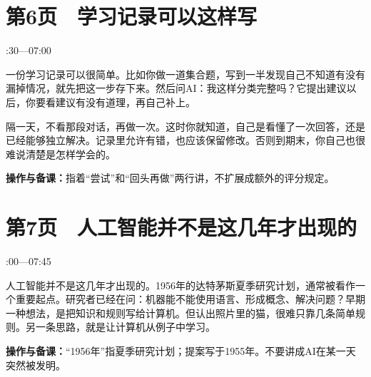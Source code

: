 \documentclass[UTF8,a4paper,11pt,fontset=fandol]{ctexart}
\newcommand{\tip}[1]{\par{\small\color{black!65}\noindent\textbf{操作与备课：}#1\par}}
\begin{document}
\par\noindent\begin{minipage}{\linewidth}

\section*{第6页　学习记录可以这样写}

{\small{}:30—07:00\par}

一份学习记录可以很简单。比如你做一道集合题，写到一半发现自己不知道有没有漏掉情况，就先把这一步存下来。然后问AI：我这样分类完整吗？它提出建议以后，你要看建议有没有道理，再自己补上。

隔一天，不看那段对话，再做一次。这时你就知道，自己是看懂了一次回答，还是已经能够独立解决。记录里允许有错，也应该保留修改。否则到期末，你自己也很难说清楚是怎样学会的。

\tip{指着“尝试”和“回头再做”两行讲，不扩展成额外的评分规定。}

\end{minipage}\par\vspace{2mm}

\par\vspace{4mm}

\par\noindent\begin{minipage}{\linewidth}

\section*{第7页　人工智能并不是这几年才出现的}

{\small{}:00—07:45\par}

人工智能并不是这几年才出现的。1956年的达特茅斯夏季研究计划，通常被看作一个重要起点。研究者已经在问：机器能不能使用语言、形成概念、解决问题？早期一种想法，是把知识和规则写给计算机。但认出照片里的猫，很难只靠几条简单规则。另一条思路，就是让计算机从例子中学习。

\tip{“1956年”指夏季研究计划；提案写于1955年。不要讲成AI在某一天突然被发明。}

\end{minipage}\par\vspace{2mm}
\end{document}
